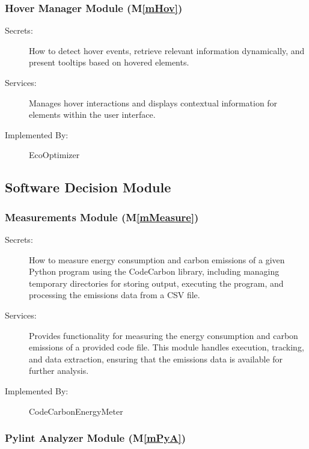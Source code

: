 \documentclass[12pt, titlepage]{article}
\newcommand{\mref}[1]{M\ref{#1}}
\begin{document}
\subsubsection{Hover Manager Module (\mref{mHov})}


\begin{description}
    \item[Secrets:] How to detect hover events, retrieve relevant information dynamically, and present tooltips based on hovered elements.
    \item[Services:] Manages hover interactions and displays contextual information for elements within the user interface.
    \item[Implemented By:] EcoOptimizer
\end{description}

\subsection{Software Decision Module}

\subsubsection{Measurements Module (\mref{mMeasure})}

\begin{description}
\item[Secrets:] How to measure energy consumption and carbon emissions of a given Python program using the CodeCarbon library, including managing temporary directories for storing output, executing the program, and processing the emissions data from a CSV file.
\item[Services:] Provides functionality for measuring the energy consumption and carbon emissions of a provided code file. This module handles execution, tracking, and data extraction, ensuring that the emissions data is available for further analysis.
\item[Implemented By:] CodeCarbonEnergyMeter
\end{description}

\subsubsection{Pylint Analyzer Module (\mref{mPyA})}
\end{document}
